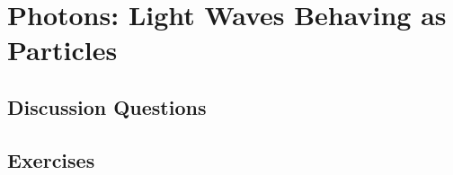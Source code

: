 
\chapter{Photons: Light Waves Behaving as Particles}

\section{Discussion Questions}

\section{Exercises}
